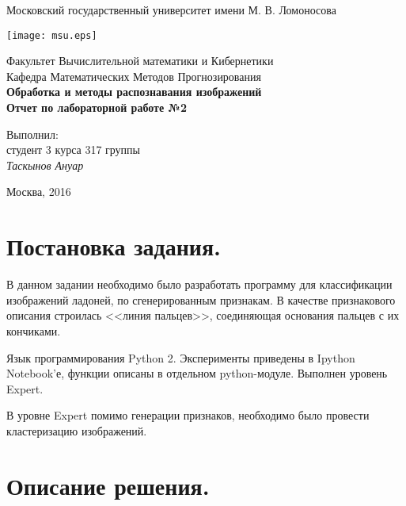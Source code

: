 \documentclass[12pt,fleqn]{article}
\begin{document}
\begin{titlepage}
\begin{center}
    Московский государственный университет имени М. В. Ломоносова

    \bigskip
    \texttt{[image: msu.eps]}

    \bigskip
    Факультет Вычислительной математики и Кибернетики\\
  	Кафедра Математических Методов Прогнозирования\\[10mm]

	\textsf{\large\bfseries
        Обработка и методы распознавания изображений
    }\\[10mm]
    \textsf{\large\bfseries
        Отчет по лабораторной работе №2
    }\\[10mm]
	
	\bigskip
	\bigskip
	\bigskip
	\bigskip
	\bigskip
	\bigskip
	\bigskip
	\bigskip
	\bigskip
	
    \begin{flushright}
        \parbox{0.5\textwidth}{
            Выполнил:\\
            студент 3 курса 317 группы\\
            \emph{Таскынов Ануар}\\[5mm]
        }
    \end{flushright}

    \vspace{\fill}
    Москва, 2016
\end{center}
\end{titlepage}

\newpage
\renewcommand{\contentsname}{Содержание.}
\tableofcontents
\newpage
\section{Постановка задания.}

В данном задании необходимо было разработать программу для классификации изображений ладоней, по сгенерированным признакам. В качестве признакового описания строилась <<линия пальцев>>, соединяющая основания пальцев с их кончиками. 

Язык программирования Python 2. Эксперименты приведены в Ipython Notebook'е, функции описаны в отдельном python-модуле. Выполнен уровень Expert.

В уровне Expert помимо генерации признаков, необходимо было провести кластеризацию изображений.

\newpage
\section{Описание решения.}
\end{document}
